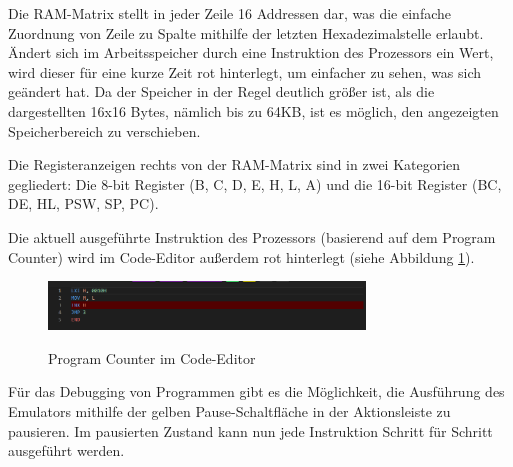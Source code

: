Die RAM-Matrix stellt in jeder Zeile 16 Addressen dar, was die einfache Zuordnung von Zeile zu Spalte mithilfe der letzten Hexadezimalstelle erlaubt. Ändert sich im Arbeitsspeicher durch eine Instruktion des Prozessors ein Wert, wird dieser für eine kurze Zeit rot hinterlegt, um einfacher zu sehen, was sich geändert hat. Da der Speicher in der Regel deutlich größer ist, als die dargestellten 16x16 Bytes, nämlich bis zu 64KB, ist es möglich, den angezeigten Speicherbereich zu verschieben.

Die Registeranzeigen rechts von der RAM-Matrix sind in zwei Kategorien gegliedert: Die 8-bit Register (B, C, D, E, H, L, A) und die 16-bit Register (BC, DE, HL, PSW, SP, PC).

Die aktuell ausgeführte Instruktion des Prozessors (basierend auf dem Program Counter) wird im Code-Editor außerdem rot hinterlegt (siehe Abbildung \ref{fig:linehighlight}).

\begin{figure}
    \caption{Program Counter im Code-Editor}
    \centering
    \includegraphics[width=0.75\textwidth]{Bilder/LineHighlight.png}
    \label{fig:linehighlight}
\end{figure}

Für das Debugging von Programmen gibt es die Möglichkeit, die Ausführung des Emulators mithilfe der gelben Pause-Schaltfläche in der Aktionsleiste zu pausieren. Im pausierten Zustand kann nun jede Instruktion Schritt für Schritt ausgeführt werden.